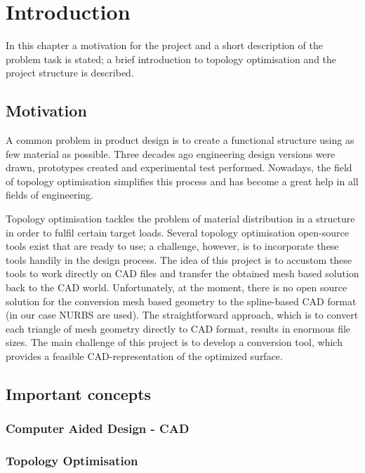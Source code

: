 \chapter{Introduction}
\label{chapter:Introduction}

In this chapter a motivation for the project and a short description of the problem task is stated; a brief introduction to topology optimisation and the project structure is described.
\section{Motivation}
A common problem in product design is to create a functional structure using as few material as possible. Three decades ago engineering design versions were drawn, prototypes created and experimental test performed. Nowadays, the field of topology optimisation simplifies this process and has become a great help in all fields of engineering. 

Topology optimisation tackles the problem of material distribution in a structure in order to fulfil certain target loads. Several topology optimisation open-source tools exist that are ready to use; a challenge, however, is to incorporate these tools handily in the design process. The idea of this project is to accustom these tools to work directly on CAD files and transfer the obtained mesh based solution back to the CAD world. Unfortunately, at the moment, there is no open source solution for the conversion mesh based geometry to the spline-based CAD format (in our case NURBS are used). The straightforward approach, which is to convert each triangle of mesh geometry directly to CAD format, results in enormous file sizes. The main challenge of this project is to develop a conversion tool, which provides a feasible CAD-representation of the optimized surface.

\section{Important concepts}

\subsection{Computer Aided Design - CAD}

\subsection{Topology Optimisation}

